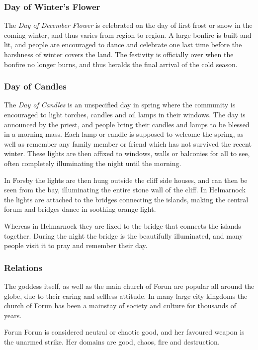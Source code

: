 \subsubsection{Day of Winter's Flower}
\label{sec:Day of Winters Flower}

The \emph{Day of December Flower} is celebrated on the day of first frost or
snow in the coming winter, and thus varies from region to region. A large
bonfire is built and lit, and people are encouraged to dance and celebrate one
last time before the harshness of winter covers the land. The festivity is
officially over when the bonfire no longer burns, and thus heralds the final
arrival of the cold season.

\subsubsection{Day of Candles}
\label{sec:Day of Candles}

The \emph{Day of Candles} is an unspecified day in spring where the community
is encouraged to light torches, candles and oil lamps in their windows. The
day is announced by the priest, and people bring their candles and lamps to be
blessed in a morning mass. Each lamp or candle is supposed to welcome the
spring, as well as remember any family member or friend which has not survived
the recent winter. These lights are then affixed to windows, walls or balconies
for all to see, often completely illuminating the night until the morning.

In Forsby the lights are then hung outside the cliff side houses, and can
then be seen from the bay, illuminating the entire stone wall of the cliff. In
Helmarnock the lights are attached to the bridges connecting the islands,
making the central forum and bridges dance in soothing orange light.

Whereas in Helmarnock they are fixed to the bridge that connects the islands
together. During the night the bridge is the beautifully illuminated, and many
people visit it to pray and remember their day.

\subsubsection{Relations}

The goddess itself, as well as the main church of Forun are popular all around
the globe, due to their caring and selfless attitude. In many large city
kingdoms the church of Forun has been a mainstay of society and culture for
thousands of years.

\begin{35e}{Forun}
  Forun is considered neutral or chaotic good, and her favoured weapon is the
  unarmed strike. Her domains are good, chaos, fire and destruction.
\end{35e}
